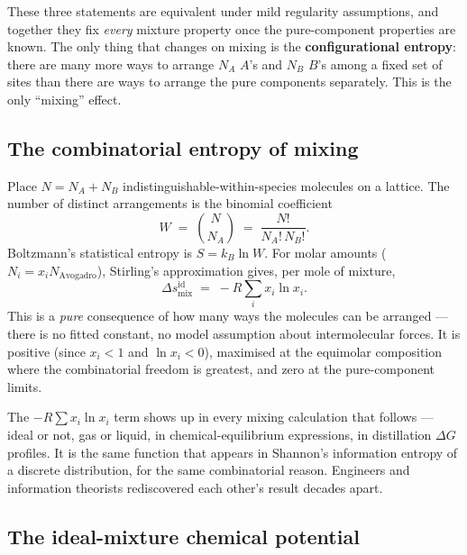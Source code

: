 \documentclass[11pt,a4paper]{article}
\begin{document}
These three statements are equivalent under mild regularity
assumptions, and together they fix \emph{every} mixture property
once the pure-component properties are known.  The only thing that
changes on mixing is the \textbf{configurational entropy}: there are
many more ways to arrange $N_A$ $A$'s and $N_B$ $B$'s among a fixed
set of sites than there are ways to arrange the pure components
separately.  This is the only ``mixing'' effect.

\subsection{The combinatorial entropy of mixing}

Place $N = N_A + N_B$ indistinguishable-within-species molecules on
a lattice.  The number of distinct arrangements is the binomial
coefficient
\begin{equation}
   W \;=\; \binom{N}{N_A} \;=\; \frac{N!}{N_A!\,N_B!}.
\end{equation}
Boltzmann's statistical entropy is $S = k_B \ln W$.  For molar
amounts ($N_i = x_i N_{\mathrm{Avogadro}}$), Stirling's approximation
gives, per mole of mixture,
\begin{equation}
   \boxed{\;
   \Delta s_{\mathrm{mix}}^{\mathrm{id}}
   \;=\; - R \sum_i x_i \ln x_i.
   \;}
   \label{eq:ideal-smix}
\end{equation}
This is a \emph{pure} consequence of how many ways the molecules can
be arranged --- there is no fitted constant, no model assumption
about intermolecular forces.  It is positive (since $x_i < 1$ and
$\ln x_i < 0$), maximised at the equimolar composition where the
combinatorial freedom is greatest, and zero at the pure-component
limits.

\begin{intuition}
The $-R \sum x_i \ln x_i$ term shows up in every mixing calculation
that follows --- ideal or not, gas or liquid, in chemical-equilibrium
expressions, in distillation $\Delta G$ profiles.  It is the same
function that appears in Shannon's information entropy of a
discrete distribution, for the same combinatorial reason.  Engineers
and information theorists rediscovered each other's result decades
apart.
\end{intuition}

\subsection{The ideal-mixture chemical potential}
\end{document}
